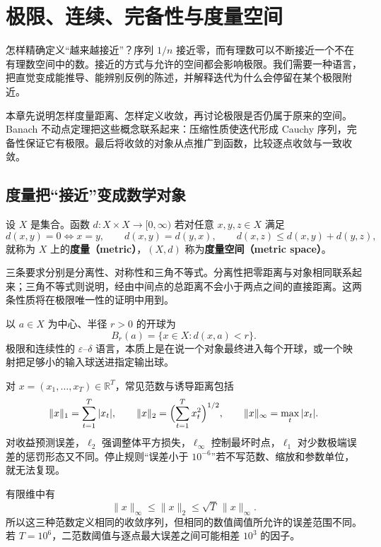 \chapter{极限、连续、完备性与度量空间}
\label{ch:analysis-foundations}


怎样精确定义“越来越接近”？序列 $1/n$ 接近零，而有理数可以不断接近一个不在有理数空间中的数。接近的方式与允许的空间都会影响极限。我们需要一种语言，把直觉变成能推导、能辨别反例的陈述，并解释迭代为什么会停留在某个极限附近。

本章先说明怎样度量距离、怎样定义收敛，再讨论极限是否仍属于原来的空间。Banach 不动点定理把这些概念联系起来：压缩性质使迭代形成 Cauchy 序列，完备性保证它有极限。最后将收敛的对象从点推广到函数，比较逐点收敛与一致收敛。

\section{度量把“接近”变成数学对象}

\begin{definition}[度量空间]
设 $X$ 是集合。函数 $d:X\times X\to[0,\infty)$ 若对任意 $x,y,z\in X$ 满足
\[
  d(x,y)=0\Longleftrightarrow x=y,\qquad
  d(x,y)=d(y,x),\qquad
  d(x,z)\leq d(x,y)+d(y,z),
\]
就称为 $X$ 上的\textbf{度量（metric）}，$(X,d)$ 称为\textbf{度量空间（metric space）}。
\end{definition}

三条要求分别是分离性、对称性和三角不等式。分离性把零距离与对象相同联系起来；三角不等式则说明，经由中间点的总距离不会小于两点之间的直接距离。这两条性质将在极限唯一性的证明中用到。

以 $a\in X$ 为中心、半径 $r>0$ 的开球为
\[
  B_r(a)=\{x\in X:d(x,a)<r\}.
\]
极限和连续性的 $\varepsilon$--$\delta$ 语言，本质上是在说一个对象最终进入每个开球，或一个映射把足够小的输入球送进指定输出球。


对 $x=(x_1,\ldots,x_T)\in\mathbb R^T$，常见范数与诱导距离包括
\[
 \lVert x\rVert_1=\sum_{t=1}^T|x_t|,\qquad
 \lVert x\rVert_2=\Bigl(\sum_{t=1}^Tx_t^2\Bigr)^{1/2},\qquad
 \lVert x\rVert_\infty=\max_t|x_t|.
\]
对收益预测误差，$\ell_2$ 强调整体平方损失，$\ell_\infty$ 控制最坏时点，$\ell_1$ 对少数极端误差的惩罚形态又不同。停止规则“误差小于 $10^{-6}$”若不写范数、缩放和参数单位，就无法复现。

有限维中有
\[
  \lVert x\rVert_\infty\leq\lVert x\rVert_2
  \leq\sqrt T\,\lVert x\rVert_\infty.
\]
所以这三种范数定义相同的收敛序列，但相同的数值阈值所允许的误差范围不同。若 $T=10^6$，二范数阈值与逐点最大误差之间可能相差 $10^3$ 的因子。

